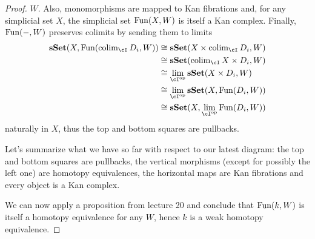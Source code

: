 \documentclass[a4paper,11pt,openany]{scrartcl}
\begin{document}
\begin{proof}
    $W$. Also, monomorphisms are mapped to Kan fibrations and, for any
    simplicial set $X$, the simplicial set $\operatorname{Fun}(X,W)$ is itself a Kan complex.
    Finally, $\operatorname{Fun}(-,W)$ preserves colimits by sending them to limits
    \begin{align*}
        \sSet(X,\Fun(\colim_{\cI}D_i,W))
        &\cong\sSet(X\times\colim_{\cI}D_i,W) \\
        &\cong\sSet(\colim_{\cI} X\times D_i,W) \\
        &\cong\lim_{\cI^{\op}}\sSet(X\times D_i,W) \\
        &\cong\lim_{\cI^{\op}}\sSet(X,\Fun(D_i,W)) \\
        &\cong\sSet(X,\lim_{\cI^{\op}}\Fun(D_i,W))
    \end{align*}
    naturally in $X$,
    thus the top and bottom squares are pullbacks.

    Let's summarize what we have so far with respect to our latest diagram: the
    top and bottom squares are pullbacks, the vertical morphisms (except for
    possibly the left one) are homotopy equivalences, the horizontal maps are
    Kan fibrations and every object is a Kan complex.

    We can now apply a proposition from lecture 20 and conclude that $\operatorname{Fun}(k,W)$
    is itself a homotopy equivalence for any $W$, hence $k$ is a weak homotopy
    equivalence.
\end{proof}
\end{document}
